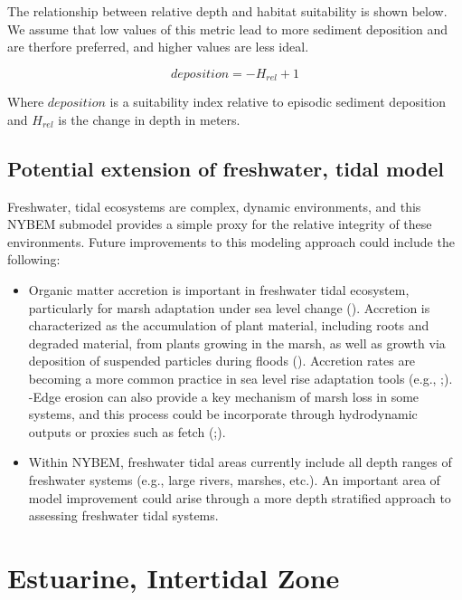 \documentclass[
]{book}
\providecommand{\tightlist}{%
  \setlength{\itemsep}{0pt}\setlength{\parskip}{0pt}}
\begin{document}
The relationship between relative depth and habitat suitability is shown below. We assume that low values of this metric lead to more sediment deposition and are therfore preferred, and higher values are less ideal.

\[deposition = -H_{rel}+1\]

Where \(deposition\) is a suitability index relative to episodic sediment deposition and \(H_{rel}\) is the change in depth in meters.

\hypertarget{potential-extension-of-freshwater-tidal-model}{%
\subsection{Potential extension of freshwater, tidal model}\label{potential-extension-of-freshwater-tidal-model}}

Freshwater, tidal ecosystems are complex, dynamic environments, and this NYBEM submodel provides a simple proxy for the relative integrity of these environments. Future improvements to this modeling approach could include the following:

\begin{itemize}
\tightlist
\item
  Organic matter accretion is important in freshwater tidal ecosystem, particularly for marsh adaptation under sea level change (\citet{schile_modeling_2014}). Accretion is characterized as the accumulation of plant material, including roots and degraded material, from plants growing in the marsh, as well as growth via deposition of suspended particles during floods (\citet{schile_modeling_2014}). Accretion rates are becoming a more common practice in sea level rise adaptation tools (e.g., \citet{morris_responses_2002};\citet{propato_evaluating_2018}).\\
  -Edge erosion can also provide a key mechanism of marsh loss in some systems, and this process could be incorporate through hydrodynamic outputs or proxies such as fetch (\citet{morris_responses_2002};\citet{propato_evaluating_2018}).\\
\item
  Within NYBEM, freshwater tidal areas currently include all depth ranges of freshwater systems (e.g., large rivers, marshes, etc.). An important area of model improvement could arise through a more depth stratified approach to assessing freshwater tidal systems.
\end{itemize}

\hypertarget{estuarine-intertidal-zone}{%
\section{Estuarine, Intertidal Zone}\label{estuarine-intertidal-zone}}
\end{document}

